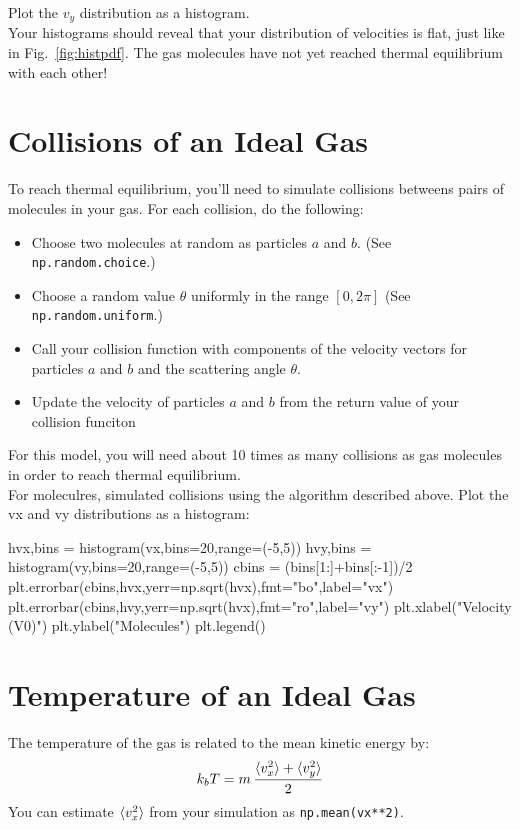 {\plot Plot the $v_y$ distribution as a histogram.\\

Your histograms should reveal that your distribution of velocities is
flat, just like in Fig.~\ref{fig:histpdf}.  The gas molecules have not
yet reached thermal equilibrium with each other!

\section{Collisions of an Ideal Gas}

To reach thermal equilibrium, you'll need to simulate collisions
betweens pairs of molecules in your gas.  For each collision, do the following:
\begin{itemize}
 \item Choose two molecules at random as particles $a$ and $b$. (See {\tt np.random.choice}.)
 \item Choose a random value $\theta$ uniformly in the range $[0,2\pi]$ (See {\tt np.random.uniform}.)
 \item Call your collision function with components of the velocity vectors for particles $a$ and $b$ and the scattering angle $\theta$.
 \item Update the velocity of particles $a$ and $b$ from the return value of your collision funciton
\end{itemize}   
For this model, you will need about 10 times as many collisions as gas
molecules in order to reach thermal equilibrium.\\

\plot For  moleculres, simulated 
collisions using the algorithm described above.  Plot the vx and vy
distributions as a histogram:
\begin{python}
hvx,bins = histogram(vx,bins=20,range=(-5,5))
hvy,bins = histogram(vy,bins=20,range=(-5,5))
cbins = (bins[1:]+bins[:-1])/2
plt.errorbar(cbins,hvx,yerr=np.sqrt(hvx),fmt="bo",label="vx")
plt.errorbar(cbins,hvy,yerr=np.sqrt(hvx),fmt="ro",label="vy")
plt.xlabel("Velocity (V0)")
plt.ylabel("Molecules")
plt.legend()
\end{python}

\section{Temperature of an Ideal Gas}

The temperature of the gas is related to the mean kinetic energy by:
\begin{equation}
\label{eqn:kt}
k_b T = m \, \frac{\braket{v_x^2} + \braket{v_y^2}}{2}  
\end{equation}  
You can estimate $\braket{v_x^2}$ from your simulation as {\tt np.mean(vx**2)}.\\

}
